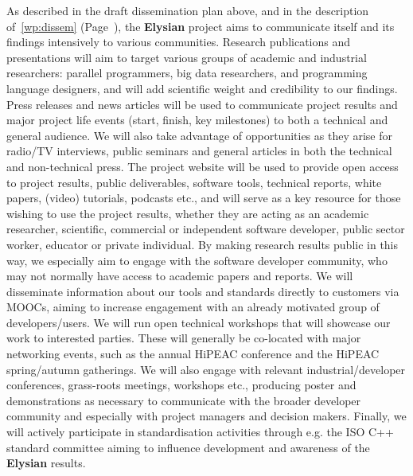\documentclass[a4paper,11pt]{article}
\newcommand{\project}[1]{\textbf{#1}\xspace}
\newcommand{\SECURITY}{\project{Elysian}}
\newcommand{\TheProject}{\SECURITY}
\begin{document}
As described in the draft dissemination plan above, and in the description of~\ref{wp:dissem} (Page~\pageref{wp:dissem}),
the \TheProject{} project aims to communicate itself and its findings intensively to various communities.
Research publications and presentations will aim to target various groups of academic and industrial researchers: parallel programmers, big data researchers, and programming language
designers, and will add scientific weight and credibility to our findings.  Press releases and news articles will be used to communicate project results and major
project life events (start, finish, key milestones) to both a technical and general audience.
We will also take advantage of opportunities as they arise for radio/TV interviews, public seminars and general articles
in both the technical and non-technical press.
The project website will be used to provide open access to project results, public deliverables,
software tools, technical reports, white papers, (video) tutorials, podcasts etc., and will serve
as a key resource for those wishing to use the project results, whether they are acting as an academic researcher, scientific, commercial or independent
software developer, public sector worker,  educator or private individual.
By making research results public in this way, we especially aim to engage with the software developer
community, who may not normally have access to academic papers and reports.
We will disseminate information about our tools and standards directly to customers via MOOCs, aiming to
increase engagement with an already motivated group of developers/users.
We will run open technical workshops that will showcase our work to interested parties.
These will generally be co-located with major networking events, such as the annual HiPEAC
conference and the HiPEAC spring/autumn gatherings.
We will also engage with relevant industrial/developer conferences, grass-roots meetings, workshops etc.,
producing poster and demonstrations as necessary to communicate with the broader developer community
and especially with project managers and decision makers.
Finally, we will actively participate in standardisation activities through e.g. the ISO C++ standard committee aiming to influence development and awareness of the \TheProject{} results.


\end{document}
